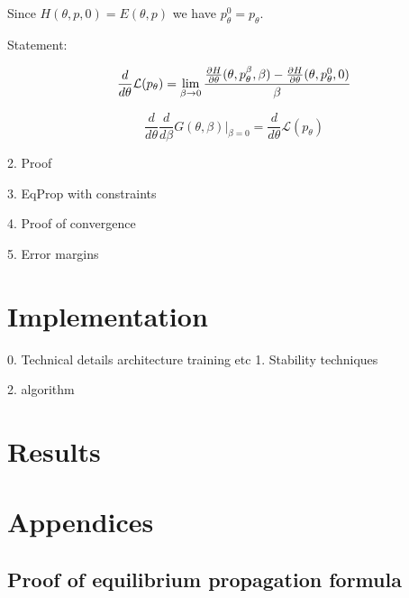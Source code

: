 \documentclass[a4paper,10pt]{report}
\begin{document}
Since $H(\theta,p,0) = E(\theta,p)$ we have $p_{\theta}^{0}=p_{\theta}$.

Statement:

\begin{equation}
 \frac{d}{d\theta} \mathcal{L}(p_\theta) = \lim_{\beta \to 0} \frac{\frac{\partial H}{\partial \theta}(\theta, p_\theta^\beta, \beta)-\frac{\partial H}{\partial \theta}(\theta, p_\theta^0, 0) }{\beta}
\end{equation}



\begin{equation}
 \frac{d}{d\theta}\frac{d}{d\beta}G(\theta,\beta)\big|_{\beta=0} = \frac{d}{d\theta} \mathcal{L}(p_\theta)
\end{equation}






2. Proof

3. EqProp with constraints



4. Proof of convergence

5. Error margins
\section{ Implementation}
0. Technical details
    architecture
    training
    etc
1. Stability techniques

2. algorithm
\section{Results}


\nocite{*}





\section{Appendices}
\subsection{Proof of equilibrium propagation formula}
\end{document}
